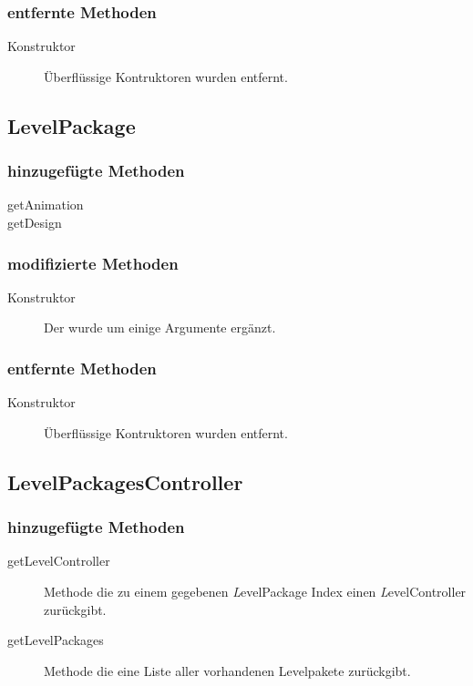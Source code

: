	\subsubsection{entfernte Methoden}
		\begin{description}
			\item[Konstruktor] Überflüssige Kontruktoren wurden entfernt.
		\end{description}


\subsection{LevelPackage}

	\subsubsection{hinzugefügte Methoden}
		\begin{description}
			\item[getAnimation]
			\item[getDesign]
		\end{description}
	\subsubsection{modifizierte Methoden}
		\begin{description}
			\item[Konstruktor] Der wurde um einige Argumente ergänzt.
		\end{description}
	\subsubsection{entfernte Methoden}
		\begin{description}
			\item[Konstruktor] Überflüssige Kontruktoren wurden entfernt.
		\end{description}



\subsection{LevelPackagesController}

	\subsubsection{hinzugefügte Methoden}
		\begin{description}
			\item[getLevelController] Methode die zu einem gegebenen \emph LevelPackage Index einen \emph 
				LevelController zurückgibt. 
			\item[getLevelPackages] Methode die eine Liste aller vorhandenen Levelpakete zurückgibt.
		\end{description}


